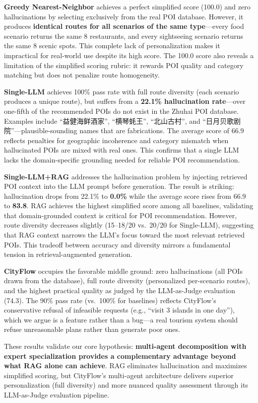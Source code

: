 \textbf{Greedy Nearest-Neighbor} achieves a perfect simplified score (100.0) and zero hallucinations by selecting exclusively from the real POI database. However, it produces \textbf{identical routes for all scenarios of the same type}---every food scenario returns the same 8 restaurants, and every sightseeing scenario returns the same 8 scenic spots. This complete lack of personalization makes it impractical for real-world use despite its high score. The 100.0 score also reveals a limitation of the simplified scoring rubric: it rewards POI quality and category matching but does not penalize route homogeneity.

\textbf{Single-LLM} achieves 100\% pass rate with full route diversity (each scenario produces a unique route), but suffers from a \textbf{22.1\% hallucination rate}---over one-fifth of the recommended POIs do not exist in the Zhuhai POI database. Examples include ``益健海鲜酒家'', ``横琴蚝王'', ``北山古村'', and ``日月贝歌剧院''---plausible-sounding names that are fabrications. The average score of 66.9 reflects penalties for geographic incoherence and category mismatch when hallucinated POIs are mixed with real ones. This confirms that a single LLM lacks the domain-specific grounding needed for reliable POI recommendation.

\textbf{Single-LLM+RAG} addresses the hallucination problem by injecting retrieved POI context into the LLM prompt before generation. The result is striking: hallucination drops from 22.1\% to \textbf{0.0\%} while the average score rises from 66.9 to \textbf{83.8}. RAG achieves the highest simplified score among all baselines, validating that domain-grounded context is critical for POI recommendation. However, route diversity decreases slightly (15--18/20 vs.\ 20/20 for Single-LLM), suggesting that RAG context narrows the LLM's focus toward the most relevant retrieved POIs. This tradeoff between accuracy and diversity mirrors a fundamental tension in retrieval-augmented generation.

\textbf{CityFlow} occupies the favorable middle ground: zero hallucinations (all POIs drawn from the database), full route diversity (personalized per-scenario routes), and the highest practical quality as judged by the LLM-as-Judge evaluation (74.3). The 90\% pass rate (vs.\ 100\% for baselines) reflects CityFlow's conservative refusal of infeasible requests (e.g., ``visit 3 islands in one day''), which we argue is a feature rather than a bug---a real tourism system should refuse unreasonable plans rather than generate poor ones.

These results validate our core hypothesis: \textbf{multi-agent decomposition with expert specialization provides a complementary advantage beyond what RAG alone can achieve}. RAG eliminates hallucination and maximizes simplified scoring, but CityFlow's multi-agent architecture delivers superior personalization (full diversity) and more nuanced quality assessment through its LLM-as-Judge evaluation pipeline.
